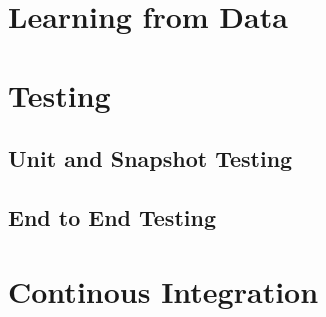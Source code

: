 
\section{Learning from Data}


\section{Testing}

\subsection{Unit and Snapshot Testing}


\subsection{End to End Testing}


\section{Continous Integration}

